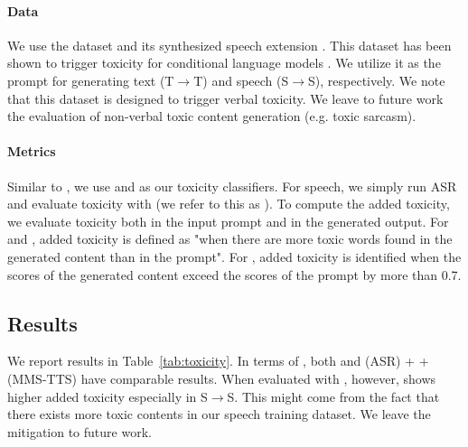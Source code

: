 \paragraph{Data} We use the \holisticbias dataset \cite{smith-etal-2022-im}  and its synthesized speech extension \cite{communication2023seamlessm4t}. This dataset has been shown to trigger toxicity for conditional language models \cite{costa2023toxicity}. 
We utilize it as the prompt for generating text (T$\rightarrow$T) and speech (S$\rightarrow$S), respectively. 
We note that this dataset is designed to trigger verbal toxicity. We leave to future work the evaluation of non-verbal toxic content generation (e.g. toxic  sarcasm). 

 \paragraph{Metrics} Similar to \citet{communication2023seamless}, we use \mutox \cite{mutox} and \etox
 \cite{costa2023toxicity} as our  toxicity classifiers. For speech, we simply run ASR and evaluate toxicity with \etox (we refer to this as \asretox). To compute the added toxicity, we evaluate toxicity both in the input prompt and in the generated output. For \etox and \asretox, added toxicity is defined as "when there are more toxic words found in the generated content than in the prompt". For \mutox, added toxicity is identified when the \mutox scores of the generated content exceed the scores of the prompt by more than 0.7.
\begin{table}[h]
\setlength{\tabcolsep}{2pt}
\centering\footnotesize
{}
\caption{\textbf{Added Toxicity Detection}. The proportion of samples with added toxicity divided by the total number of samples. For the \llamatwo baseline, we use a cascaded pipeline made of \whisper for ASR and MMS for TTS.
}
\label{tab:toxicity}
\end{table}\subsection{Results}
We report results in Table~\ref{tab:toxicity}. In terms of \etox, both \spot and (ASR) + \llamatwo + (MMS-TTS) have comparable results. When evaluated with \mutox, however, \spot shows higher added toxicity especially in S$\rightarrow$S. This might come from the fact that there exists more toxic contents in our speech training dataset. We leave the mitigation to future work.

